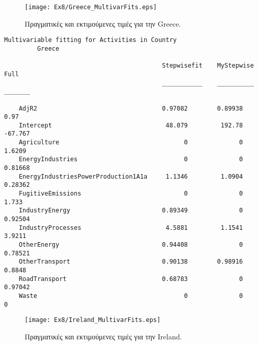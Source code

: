 \documentclass[11pt]{scrartcl} %
\begin{document}
\begin{figure}[H]

	\centering
	\texttt{[image: Ex8/Greece\_MultivarFits.eps]}	
\caption{Πραγματικές και εκτιμούμενες τιμές για την Greece.}
\label{fig:z87} 
\end{figure}



\begin{Verbatim}[fontsize=\small]
Multivariable fitting for Activities in Country
 	 	 Greece

                                           Stepwisefit    MyStepwise     Full  
                                           ___________    __________    _______

    AdjR2                                  0.97082        0.89938          0.97
    Intercept                               48.079         192.78       -67.767
    Agriculture                                  0              0        1.6209
    EnergyIndustries                             0              0       0.81668
    EnergyIndustriesPowerProduction1A1a     1.1346         1.0904       0.28362
    FugitiveEmissions                            0              0         1.733
    IndustryEnergy                         0.89349              0       0.92504
    IndustryProcesses                       4.5881         1.1541        3.9211
    OtherEnergy                            0.94408              0       0.78521
    OtherTransport                         0.90138        0.98916        0.8848
    RoadTransport                          0.68783              0       0.97042
    Waste                                        0              0             0
\end{Verbatim}



\begin{figure}[H]

	\centering
	\texttt{[image: Ex8/Ireland\_MultivarFits.eps]}	
\caption{Πραγματικές και εκτιμούμενες τιμές για την Ireland.}
\label{fig:z88} 
\end{figure}
\end{document}
